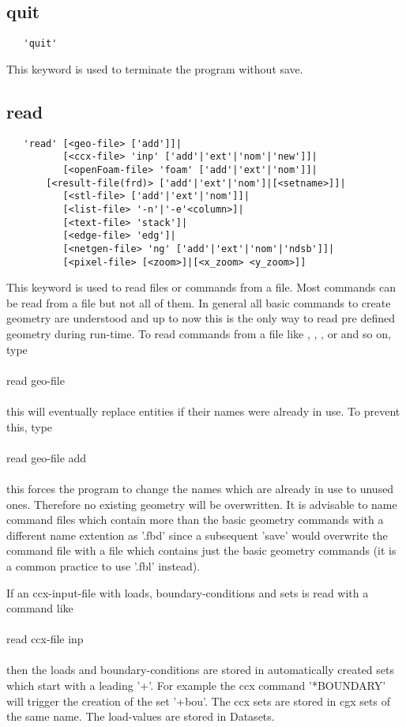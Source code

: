 \documentclass{article}
\begin{document}
\subsection{\label{quit}quit}
\begin{verbatim}
   'quit' 
\end{verbatim}
This keyword is used to terminate the program without save. 

\subsection{\label{read}read}
\begin{verbatim}
   'read' [<geo-file> ['add']]|
          [<ccx-file> 'inp' ['add'|'ext'|'nom'|'new']]|
          [<openFoam-file> 'foam' ['add'|'ext'|'nom']]|
       [<result-file(frd)> ['add'|'ext'|'nom']|[<setname>]]|
          [<stl-file> ['add'|'ext'|'nom']]|
          [<list-file> '-n'|'-e'<column>]|
          [<text-file> 'stack']|
          [<edge-file> 'edg']|
          [<netgen-file> 'ng' ['add'|'ext'|'nom'|'ndsb']]|
          [<pixel-file> [<zoom>]|[<x_zoom> <y_zoom>]]
\end{verbatim}
This keyword is used to read files or commands from a file. Most commands can be read from a file but not all of them. In general all basic commands to create geometry are understood and up to now this is the only way to read pre defined geometry during run-time. To read commands from a file like , , , or  and so on, type\\\\read geo-file\\\\this will eventually replace entities if their names were already in use. To prevent this, type\\\\read geo-file add\\\\this forces the program to change the names which are already in use to unused ones. Therefore no existing geometry will be overwritten. It is advisable to name command files which contain more than the basic geometry commands with a different name extention as '.fbd' since a subsequent 'save' would overwrite the command file with a file which contains just the basic geometry commands (it is a common practice to use '.fbl' instead). 

If an ccx-input-file with loads, boundary-conditions and sets is read with a command like\\\\read ccx-file inp\\\\then the loads and boundary-conditions are stored in automatically created sets which start with a leading '+'. For example the ccx command '*BOUNDARY' will trigger the creation of the set '+bou'. The ccx sets are stored in cgx sets of the same name. The load-values are stored in Datasets.
\end{document}
